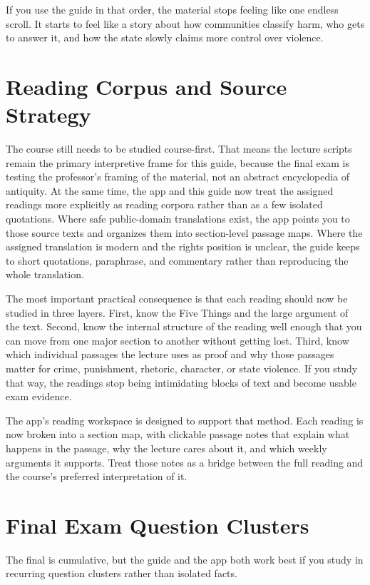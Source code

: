 \documentclass[11pt]{article}
\begin{document}
If you use the guide in that order, the material stops feeling like one endless scroll. It starts to feel like a story about how communities classify harm, who gets to answer it, and how the state slowly claims more control over violence.

\section{Reading Corpus and Source Strategy}

The course still needs to be studied course-first. That means the lecture scripts remain the primary interpretive frame for this guide, because the final exam is testing the professor's framing of the material, not an abstract encyclopedia of antiquity. At the same time, the app and this guide now treat the assigned readings more explicitly as reading corpora rather than as a few isolated quotations. Where safe public-domain translations exist, the app points you to those source texts and organizes them into section-level passage maps. Where the assigned translation is modern and the rights position is unclear, the guide keeps to short quotations, paraphrase, and commentary rather than reproducing the whole translation.

The most important practical consequence is that each reading should now be studied in three layers. First, know the Five Things and the large argument of the text. Second, know the internal structure of the reading well enough that you can move from one major section to another without getting lost. Third, know which individual passages the lecture uses as proof and why those passages matter for crime, punishment, rhetoric, character, or state violence. If you study that way, the readings stop being intimidating blocks of text and become usable exam evidence.

The app's reading workspace is designed to support that method. Each reading is now broken into a section map, with clickable passage notes that explain what happens in the passage, why the lecture cares about it, and which weekly arguments it supports. Treat those notes as a bridge between the full reading and the course's preferred interpretation of it.

\section{Final Exam Question Clusters}

The final is cumulative, but the guide and the app both work best if you study in recurring question clusters rather than isolated facts.
\end{document}
